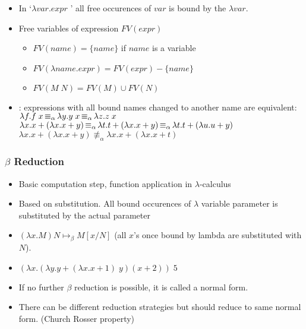 \begin{frame}
 \begin{itemize}
  \item In `$\lambda var . expr$ ' all free occurences of $var$ is bound by the $\lambda var$.
  \item Free variables of expression $FV(expr)$\\
	\begin{itemize}
	\item $FV(name) = \{ name \} $ if $name$ is a variable
        \item $FV(\lambda name. expr)= FV(expr) - \{name\}$
        \item $FV(M \; N) = FV(M) \cup FV(N)$
        \end{itemize}
  \item {}: expressions with all bound names changed to another name are equivalent:\\
	$\lambda f. f \; x \mathop{\equiv_{\alpha}} \lambda y. y \; x \mathop{\equiv_{\alpha}} \lambda z. z \; x$ \\
        $\lambda x. x + (\lambda x. x+y) \mathop{\equiv_{\alpha}} \lambda t. t + (\lambda x. x+y)
	\mathop{\equiv_{\alpha}} \lambda t. t + (\lambda u. u+y)$\\
        $\lambda x. x + (\lambda x. x+y) \not\equiv_{\alpha} \lambda x. x + (\lambda x. x+t)$
 \end{itemize}
\end{frame}

\begin{frame}
 \frametitle{ $\beta$ Reduction}
\begin{itemize}
 \item Basic computation step, function application in $\lambda$-calculus
 \item Based on substitution. All bound occurences of $\lambda$ variable parameter is substituted by the
       actual parameter
 \item $(\lambda x . M) N \mapsto_{\beta} M [x/N]$ (all $x$'s once bound by lambda are substituted with $N$).
 \item $(\lambda x.(\lambda y.y+(\lambda x.x+1)\;y) (x+2))\; 5$
 \item If no further $\beta$ reduction is possible, it is called a normal form.
 \item There can be different reduction strategies but should reduce to 
	same normal form. (Church Rosser property)
\end{itemize}
\end{frame}

